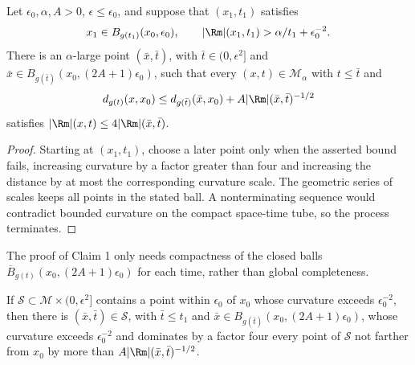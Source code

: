 \begin{claim}
\label{clm:chow-iii-point-picking-claim-one}
Let \(\epsilon_0,\alpha,A>0\), \(\epsilon\le\epsilon_0\), and suppose that
\((x_1,t_1)\) satisfies
\[
 x_1\in B_{g(t_1)}(x_0,\epsilon_0),\qquad
 |\Rm|(x_1,t_1)>\alpha/t_1+\epsilon_0^{-2}.
\]
There is an \(\alpha\)-large point \((\bar x,\bar t)\), with
\(\bar t\in(0,\epsilon^2]\) and
\(\bar x\in B_{g(\bar t)}(x_0,(2A+1)\epsilon_0)\), such that every
\((x,t)\in\mathcal M_\alpha\) with \(t\le\bar t\) and
\[
 d_{g(t)}(x,x_0)\le d_{g(\bar t)}(\bar x,x_0)+A|\Rm|(\bar x,\bar t)^{-1/2}
\]
satisfies \(|\Rm|(x,t)\le4|\Rm|(\bar x,\bar t)\).
\end{claim}
\begin{proof}
\sketch Starting at \((x_1,t_1)\), choose a later point only when the asserted bound
fails, increasing curvature by a factor greater than four and increasing the
distance by at most the corresponding curvature scale.  The geometric series
of scales keeps all points in the stated ball.  A nonterminating sequence would
contradict bounded curvature on the compact space-time tube, so the process
terminates.
\end{proof}

\begin{remark}
\label{rem:chow-iii-point-picking-compactness}
The proof of Claim 1 only needs compactness of the closed balls
\(\overline B_{g(t)}(x_0,(2A+1)\epsilon_0)\) for each time, rather than global
completeness.
\end{remark}

\begin{lemma}
\label{lem:chow-iii-point-picking-subset}
If \(\mathcal S\subset\mathcal M\times(0,\epsilon^2]\) contains a point within
\(\epsilon_0\) of \(x_0\) whose curvature exceeds \(\epsilon_0^{-2}\), then
there is \((\bar x,\bar t)\in\mathcal S\), with \(\bar t\le t_1\) and
\(\bar x\in B_{g(\bar t)}(x_0,(2A+1)\epsilon_0)\), whose curvature exceeds
\(\epsilon_0^{-2}\) and dominates by a factor four every point of \(\mathcal S\)
not farther from \(x_0\) by more than \(A|\Rm|(\bar x,\bar t)^{-1/2}\).
\end{lemma}

